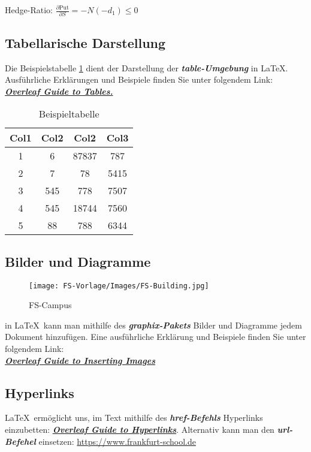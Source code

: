 \documentclass[12pt,a4paper]{article}
\begin{document}
Hedge-Ratio: $\frac{\partial \text{Put}}{\partial S}=-N(-d_1)\leq 0$

\subsection{Tabellarische Darstellung}\label{numeric}

Die Beispielstabelle \ref{Tbsp} dient der Darstellung der \textbf{\emph{table-Umgebung}} in \LaTeX.\\
Ausführliche Erklärungen und Beispiele finden Sie unter folgendem Link:\\
\href{https://www.overleaf.com/learn/latex/tables}{\textbf{\emph {Overleaf Guide to Tables.}}}
\begin{table}[h!]
\centering
\begin{tabular}{||c c c c||} 
 \hline
 Col1 & Col2 & Col2 & Col3 \\ [0.5ex] 
 \hline\hline
 1 & 6 & 87837 & 787 \\ 
 2 & 7 & 78 & 5415 \\
 3 & 545 & 778 & 7507 \\
 4 & 545 & 18744 & 7560 \\
 5 & 88 & 788 & 6344 \\ [1ex] 
 \hline
\end{tabular}
\caption{Beispieltabelle}
\label{Tbsp}
\end{table}
\newpage
\subsection{Bilder und Diagramme}
\begin{figure}[h]
\texttt{[image: FS-Vorlage/Images/FS-Building.jpg]}
\caption{FS-Campus} \centering\cite{fs}
\end{figure}
in \LaTeX\ kann man mithilfe des {\textbf{\emph {graphix-Pakets}}} Bilder und Diagramme jedem Dokument hinzufügen. Eine ausführliche Erklärung und Beispiele finden Sie unter folgendem Link:\\
\href{https://de.overleaf.com/learn/latex/Inserting_Images}{\textbf{\emph{Overleaf Guide to Inserting Images}}}

\subsection{Hyperlinks}
\LaTeX\ ermöglicht uns, im Text mithilfe des \textbf{\emph{href-Befehls}}  Hyperlinks einzubetten:\newline
\href{https://www.overleaf.com/learn/latex/Hyperlinks}{\textbf{\emph{Overleaf Guide to Hyperlinks}}}.\newline
Alternativ kann man den {\textbf{\emph{url-Befehel}}} einsetzen: \url{https://www.frankfurt-school.de}
\end{document}
